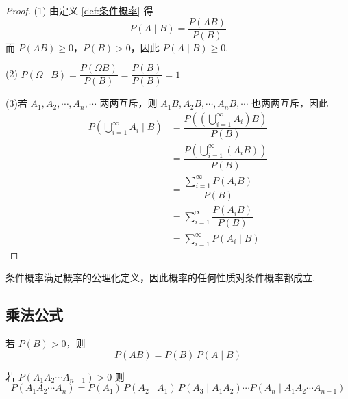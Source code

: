 \begin{proof}
    (1) 由定义 \ref{def:条件概率} 得
    $$P(A \mid B) = \dfrac{P(AB)}{P(B)}$$
    而 $P(AB) \geqslant 0$，$P(B)>0$，因此 $P(A \mid B) \geqslant 0$.

    \vspace{0.5em}

    (2) $P(\varOmega \mid B) = \dfrac{P(\varOmega B)}{P(B)} = \dfrac{P(B)}{P(B)} = 1$

    \vspace{0.5em}

    (3)若 $A_1, A_2, \cdots, A_n, \cdots$ 两两互斥，则 $A_1 B, A_2 B, \cdots, A_n B, \cdots$ 也两两互斥，因此
    $$
    \begin{aligned}
        P \left( \bigcup_{i=1}^{\infty} A_i \mid B \right) &= \dfrac{P \left( \left( \displaystyle\bigcup_{i=1}^{\infty} A_i \right) B \right)}{P(B)} \\
        &= \dfrac{P \left( \displaystyle\bigcup_{i=1}^{\infty} (A_i B) \right)}{P(B)} \\
        &= \dfrac{\displaystyle\sum_{i=1}^{\infty} P(A_i B)}{P(B)} \\
        &= \sum_{i=1}^{\infty} \dfrac{P(A_i B)}{P(B)} \\
        &= \sum_{i=1}^{\infty} P(A_i \mid B)
    \end{aligned}
    $$

    \vspace{-2em}
\end{proof}

\begin{note}
    \indent 条件概率满足概率的公理化定义，因此概率的任何性质对条件概率都成立.
\end{note}

\subsection{乘法公式}

\begin{theorem}[][乘法公式]
    \indent 若 $P(B)>0$，则
    \begin{equation} \label{equation:乘法公式}
        P(AB) = P(B) \, P(A \mid B)    
    \end{equation}
    
    若 $P(A_1 A_2 \cdots A_{n-1}) > 0$ 则
    \begin{equation} \label{equation:一般的乘法公式}
        P(A_1 A_2 \cdots A_n) = P(A_1) \, P(A_2 \mid A_1) \, P(A_3 \mid A_1 A_2) \cdots P(A_n \mid A_1 A_2 \cdots A_{n-1})
    \end{equation}
\end{theorem}

